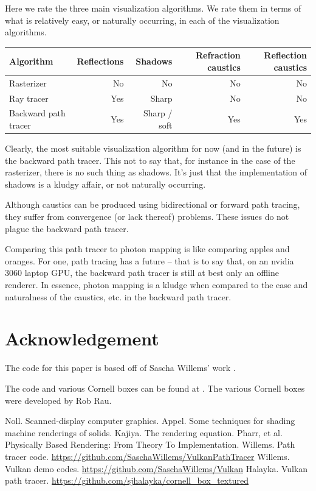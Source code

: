 \documentclass[12pt]{article}
\begin{document}
Here we rate the three main visualization algorithms.
We rate them in terms of what is relatively easy, or naturally occurring, in each of the visualization algorithms.
\begin{center}
\begin{tabular}{| l | r | r | r | r |}
  \hline
 Algorithm &  Reflections & Shadows & Refraction caustics & Reflection caustics \\
\hline
\hline
Rasterizer & No & No & No &  No \\
Ray tracer & Yes & Sharp & No & No  \\
Backward path tracer & Yes & Sharp / soft & Yes & Yes \\
  \hline  
\end{tabular}
\end{center}
Clearly, the most suitable visualization algorithm for now (and in the future) is the backward path tracer.
This not to say that, for instance in the case of the rasterizer, there is no such thing as shadows.
It's just that the implementation of shadows is a kludgy affair, or not naturally occurring.

Although caustics can be produced using bidirectional or forward path tracing, they suffer from convergence (or lack thereof) problems.
These issues do not plague the backward path tracer.

Comparing this path tracer to photon mapping is like comparing apples and oranges.
For one, path tracing has a future -- that is to say that, on an nvidia 3060 laptop GPU, the backward path tracer is still at best only an offline renderer.
In essence, photon mapping is a kludge when compared to the ease and naturalness of the caustics, etc. in the backward path tracer.




\section{Acknowledgement}

The code for this paper is based off of Sascha Willems' work \cite{willems1, willems2}.

The code and various Cornell boxes can be found at \cite{halayka}. 
The various Cornell boxes were developed by Rob Rau.






\begin{thebibliography}{9}

 Noll. Scanned-display computer graphics.
 Appel. Some techniques for shading machine renderings of solids.
 Kajiya. The rendering equation.
 Pharr, et al. Physically Based Rendering: From Theory To Implementation.
 Willems. Path tracer code. \url{https://github.com/SaschaWillems/VulkanPathTracer}
 Willems. Vulkan demo codes. \url{https://github.com/SaschaWillems/Vulkan}
 Halayka. Vulkan path tracer. \url{https://github.com/sjhalayka/cornell_box_textured}


\end{thebibliography}
\end{document}
